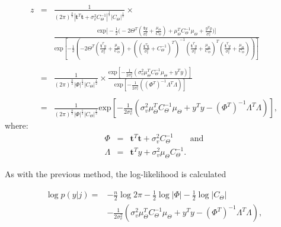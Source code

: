 {\setlength\arraycolsep{2pt}
\begin{eqnarray}\label{eq:z25}
z &=& \frac{1}{(2\pi)^{\frac{n}{2}} |\textbf{t}^T\textbf{t}+\sigma_v^2C_\Theta^{-1}|^{\frac{1}{2}} |C_\Theta|^{\frac{1}{2}}} \times {}\\\nonumber
& &\frac{\textrm{exp}\Bigg[-\frac{1}{2}\Bigg(- 2 \Theta^T\left(\frac{\textbf{t}y}{\sigma_v^2} + \frac{\mu_\Theta}{C_\Theta}\right) +  \mu_\Theta^TC_\Theta^{-1}\mu_\Theta + \frac{y^Ty}{\sigma_v^2}\Bigg)\Bigg]}{\textrm{exp}\left[-\frac{1}{2}\left(- 2\Theta^T\left(\frac{\textbf{t}^Ty}{\sigma_v^2} + \frac{\mu_\Theta}{C_\Theta}\right)  + \left(\left(\frac{\textbf{t}^T\textbf{t}}{\sigma_v^2} + C_\Theta^{-1}\right)^T\right)^{-1}\left(\frac{\textbf{t}^Ty}{\sigma_v^2} + \frac{\mu_\Theta}{C_\Theta}\right)^T\left(\frac{\textbf{t}^Ty}{\sigma_v^2} + \frac{\mu_\Theta}{C_\Theta}\right) \right)\right]}\\\nonumber{}\\\nonumber
&=& \frac{1}{(2\pi)^{\frac{n}{2}} |\Phi|^{\frac{1}{2}} |C_\Theta|^{\frac{1}{2}}}\times \frac{\textrm{exp}\left[-\frac{1}{2\sigma_v^2}\left(\sigma_v^2\mu_\Theta^TC_\Theta^{-1}\mu_\Theta + y^Ty\right)\right]}{\textrm{exp}\left[-\frac{1}{2\sigma_v^2}\left(\left(\Phi^T\right)^{-1}\Lambda^T\Lambda \right)\right]}\\\nonumber{}\\\nonumber
&=& \frac{1}{(2\pi)^{\frac{n}{2}} |\Phi|^{\frac{1}{2}}|C_\Theta|^{\frac{1}{2}}} \textrm{exp}\left[-\frac{1}{2\sigma_v^2}\left(\sigma_v^2\mu_\Theta^TC_\Theta^{-1}\mu_\Theta + y^Ty- \left(\Phi^T\right)^{-1}\Lambda^T\Lambda\right)\right],
\end{eqnarray}}
where:
\begin{eqnarray}
\label{eq:z3}
\Phi &=& \textbf{t}^T\textbf{t} + \sigma_v^2C_\Theta^{-1} \qquad \textrm{and}\\\nonumber
\Lambda &=& \textbf{t}^Ty + \sigma_v^2\mu_\Theta C_\Theta^{-1}.
\end{eqnarray}

As with the previous method, the log-likelihood is calculated

\begin{equation}\begin{split}\label{eq:loglikeli}
\log{p(y|j)} = &- \frac{n}{2}\log{2 \pi}- \frac{1}{2}\log{|\Phi|} - \frac{1}{2}\log{|C_\Theta|} \\
&- \frac{1}{2\sigma^2_v}\left(\sigma_v^2\mu_\Theta^TC_\Theta^{-1}\mu_\Theta + y^Ty- \left(\Phi^T\right)^{-1}\Lambda^T\Lambda\right),
\end{split}\end{equation}

